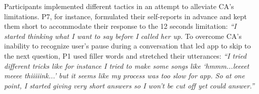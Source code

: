         
        Participants implemented different tactics in an attempt to alleviate \ac{CA}'s limitations. 
        P7, for instance, formulated their self-reports in advance and kept them short to accommodate their response to the 12 seconds limitation:
            \textit{``I started thinking what I want to say before I called her up.}
        To overcome \ac{CA}'s inability to recognize user's pause during a conversation that led \acl{app} to skip to the next question, P1 used filler words and stretched their utterances:
                \textit{``I tried different tricks like for instance I tried to make some songs like `hmmm...leeeet meeee thiiiiink...' but it seems like my process was too slow for \acl{app}. So at one point, I started giving very short answers so I won’t be cut off yet could answer.''}
